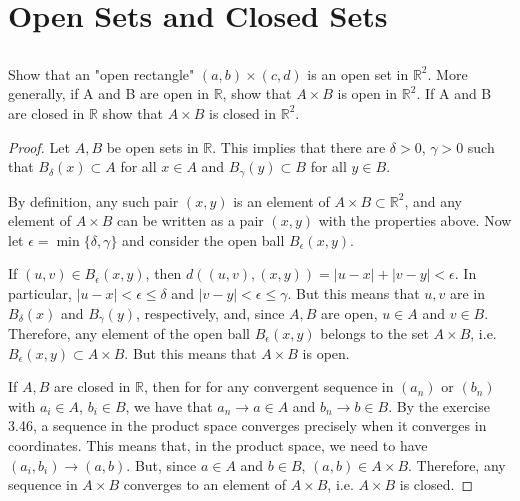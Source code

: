 \section {Open Sets and Closed Sets}

\subsection{} Show that an "open rectangle" $(a, b) \times (c, d)$ is an open set in $\mathbb{R}^2$. More generally, if A and B are open in $\mathbb{R}$, show that $A \times B$ is open in $\mathbb{R}^2$. If A and B are closed in $\mathbb{R}$ show that $A \times B$ is closed in $\mathbb{R}^2$.

\begin{proof}
Let $A,B$ be open sets in $\mathbb{R}$. This implies that there are $\delta>0$, $\gamma>0$ such that $B_\delta(x) \subset A$ for all $x \in A$ and $B_\gamma(y) \subset B$ for all $y \in B$.

By definition, any such pair $(x,y)$ is an element of $A \times B \subset \mathbb{R}^2$, and any element of $A \times B$ can be written as a pair $(x,y)$ with the properties above. Now let $\epsilon = \min\{\delta, \gamma\}$ and consider the open ball $B_\epsilon(x,y)$. 

If $(u,v) \in B_\epsilon(x,y)$, then $d((u,v), (x,y)) = |u-x| + |v-y| < \epsilon$. In particular, $|u-x| < \epsilon \leq \delta$ and $|v-y| < \epsilon \leq \gamma$. But this means that $u,v$ are in $B_\delta(x)$ and $B_\gamma(y)$, respectively, and, since $A,B$ are open, $u \in A$ and $v \in B$. Therefore, any element of the open ball $B_\epsilon(x,y)$ belongs to the set $A \times B$, i.e. $B_\epsilon(x,y) \subset A \times B$. But this means that $A \times B$ is open.

\vspace{1em}

If $A,B$ are closed in $\mathbb{R}$, then for for any convergent sequence in $(a_n)$ or $(b_n)$ with $a_i \in A$, $b_i \in B$, we have that $a_n \rightarrow a \in A$ and $b_n \rightarrow b \in B$. By the exercise 3.46, a sequence in the product space converges precisely when it converges in coordinates. This means that, in the product space, we need to have $(a_i, b_i) \rightarrow (a,b)$. But, since $a \in A$ and  $b \in B$, $(a,b) \in A \times B$. Therefore, any sequence in $A \times B$ converges to an element of $A \times B$, i.e. $A \times B$ is closed.

\end{proof}

